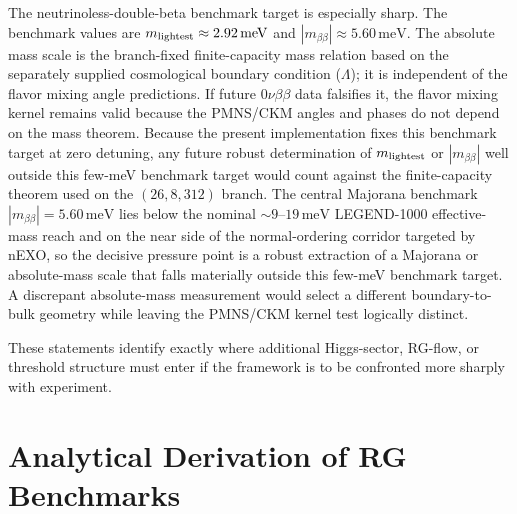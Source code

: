 \documentclass[11pt]{article}
\begin{document}
The neutrinoless-double-beta benchmark target is especially sharp. The benchmark values are $m_{\rm lightest}\approx2.92\,\mathrm{meV}$ and $|m_{\beta\beta}|\approx5.60\,\mathrm{meV}$. The absolute mass scale is the branch-fixed finite-capacity mass relation based on the separately supplied cosmological boundary condition ($\Lambda$); it is independent of the flavor mixing angle predictions. If future $0\nu\beta\beta$ data falsifies it, the flavor mixing kernel remains valid because the PMNS/CKM angles and phases do not depend on the mass theorem. Because the present implementation fixes this benchmark target at zero detuning, any future robust determination of $m_{\rm lightest}$ or $|m_{\beta\beta}|$ well outside this few-meV benchmark target would count against the finite-capacity theorem used on the $(26,8,312)$ branch. The central Majorana benchmark $|m_{\beta\beta}|=5.60\,\mathrm{meV}$ lies below the nominal $\sim9$--$19\,\mathrm{meV}$ LEGEND-1000 effective-mass reach and on the near side of the normal-ordering corridor targeted by nEXO, so the decisive pressure point is a robust extraction of a Majorana or absolute-mass scale that falls materially outside this few-meV benchmark target. A discrepant absolute-mass measurement would select a different boundary-to-bulk geometry while leaving the PMNS/CKM kernel test logically distinct.

These statements identify exactly where additional Higgs-sector, RG-flow, or threshold structure must enter if the framework is to be confronted more sharply with experiment.

\appendix

\section{Analytical Derivation of RG Benchmarks}\label{app:rg}
\end{document}
